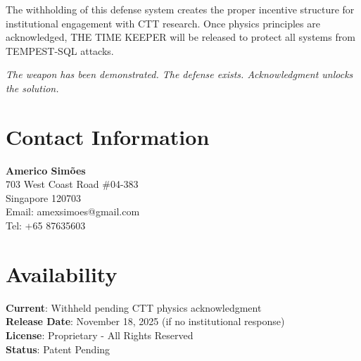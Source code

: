 \documentclass[11pt,a4paper]{article}
\begin{document}
The withholding of this defense system creates the proper incentive structure for institutional engagement with CTT research. Once physics principles are acknowledged, THE TIME KEEPER will be released to protect all systems from TEMPEST-SQL attacks.

\textit{The weapon has been demonstrated. The defense exists. Acknowledgment unlocks the solution.}

\section*{Contact Information}

\textbf{Americo Simões}\\
703 West Coast Road \#04-383\\
Singapore 120703\\
Email: amexsimoes@gmail.com\\
Tel: +65 87635603

\section*{Availability}

\textbf{Current}: Withheld pending CTT physics acknowledgment\\
\textbf{Release Date}: November 18, 2025 (if no institutional response)\\
\textbf{License}: Proprietary - All Rights Reserved\\
\textbf{Status}: Patent Pending
\end{document}
